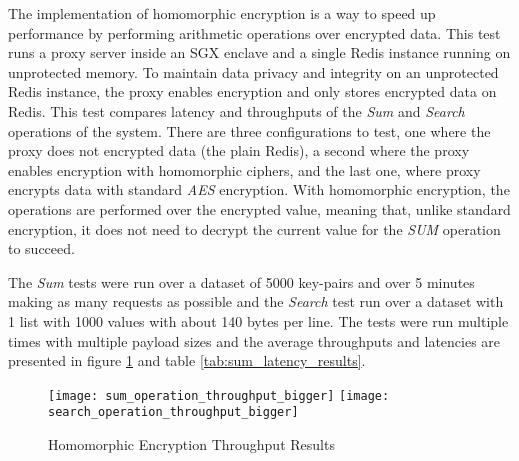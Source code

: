 The implementation of homomorphic encryption is a way to speed up performance by performing arithmetic operations over encrypted data. This test runs a proxy server inside an \gls{SGX} enclave and a single Redis instance running on unprotected memory. To maintain data privacy and integrity on an unprotected Redis instance, the proxy enables encryption and only stores encrypted data on Redis. This test compares latency and throughputs of the \textit{Sum} and \textit{Search} operations of the system. There are three configurations to test, one where the proxy does not encrypted data (the plain Redis), a second where the proxy enables encryption with homomorphic ciphers, and the last one, where proxy encrypts data with standard \textit{AES} encryption. With homomorphic encryption, the operations are performed over the encrypted value, meaning that, unlike standard encryption, it does not need to decrypt the current value for the \textit{SUM} operation to succeed.

The \textit{Sum} tests were run over a dataset of 5000 key-pairs and over 5 minutes making as many requests as possible and the \textit{Search} test run over a dataset with 1 list with 1000 values with about 140 bytes per line. The tests were run multiple times with multiple payload sizes and the average throughputs and latencies are presented in figure \ref{fig:homomorphic_encryption_throughput_results} and table \ref{tab:sum_latency_results}.

\begin{figure}[htbp]
  \centering
  \hspace*{-8mm}
    {\texttt{[image: sum\_operation\_throughput\_bigger]}}%
    {\texttt{[image: search\_operation\_throughput\_bigger]}}%
  \caption{Homomorphic Encryption Throughput Results}
  \label{fig:homomorphic_encryption_throughput_results}
\end{figure}

